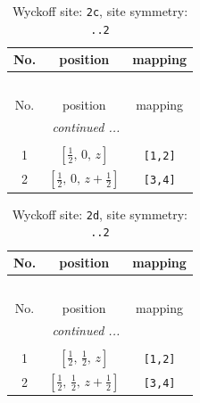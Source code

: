 \documentclass[fleqn,8pt]{jsarticle}
\begin{document}
\renewcommand{\arraystretch}{1.2}
\begin{longtable}{ccc}
\caption{Wyckoff site: {\tt 2c}, site symmetry: {\tt ..2}}
 \\
 \hline \hline
No. & position & mapping \\ \hline \endfirsthead

\multicolumn{2}{l}{\tablename\ \thetable{}} \\
 \hline \hline
No. & position & mapping \\ \hline \endhead

 \hline \hline
\multicolumn{2}{r}{\footnotesize\it continued ...} \\ \endfoot

 \hline \hline
\multicolumn{2}{r}{} \\ \endlastfoot

1 & $\left[ \frac{1}{2},\, 0,\, z \right]$ & {\tt [1,2]} \\ \hline
2 & $\left[ \frac{1}{2},\, 0,\, z + \frac{1}{2} \right]$ & {\tt [3,4]} \\
\end{longtable}
\renewcommand{\arraystretch}{1.2}
\begin{longtable}{ccc}
\caption{Wyckoff site: {\tt 2d}, site symmetry: {\tt ..2}}
 \\
 \hline \hline
No. & position & mapping \\ \hline \endfirsthead

\multicolumn{2}{l}{\tablename\ \thetable{}} \\
 \hline \hline
No. & position & mapping \\ \hline \endhead

 \hline \hline
\multicolumn{2}{r}{\footnotesize\it continued ...} \\ \endfoot

 \hline \hline
\multicolumn{2}{r}{} \\ \endlastfoot

1 & $\left[ \frac{1}{2},\, \frac{1}{2},\, z \right]$ & {\tt [1,2]} \\ \hline
2 & $\left[ \frac{1}{2},\, \frac{1}{2},\, z + \frac{1}{2} \right]$ & {\tt [3,4]} \\
\end{longtable}
\renewcommand{\arraystretch}{1.2}
\end{document}
